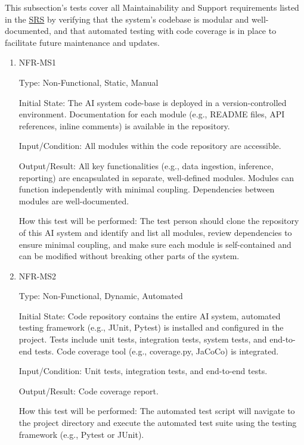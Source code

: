 \documentclass[12pt, titlepage]{article}
\begin{document}
\begin{enumerate}
This subsection's tests cover all Maintainability and Support requirements listed in the \href{https://github.com/RezaJodeiri/CXR-Capstone/blob/main/docs/SRS/SRS.pdf}{SRS} \citep{SRS}
 by verifying that the system's codebase is modular and well-documented, and that automated testing with code coverage is in place to facilitate future maintenance and updates.

\begin{enumerate}

\item{NFR-MS1}\label{NFR-MS1}

Type: Non-Functional, Static, Manual

Initial State: The AI system code-base is deployed in a version-controlled environment. Documentation for each module (e.g., README files, API references, inline comments) is available in the repository.

Input/Condition: All modules within the code repository are accessible.

Output/Result: All key functionalities (e.g., data ingestion, inference, reporting) are encapsulated in separate, well-defined modules. Modules can function independently with minimal coupling. Dependencies between modules are well-documented.

How this test will be performed: The test person should clone the repository of this AI system and identify and list all modules, review dependencies to ensure minimal coupling, and make sure each module is self-contained and can be modified without breaking other parts of the system.

\item{NFR-MS2}\label{NFR-MS2}

Type: Non-Functional, Dynamic, Automated

Initial State: Code repository contains the entire AI system, automated testing framework (e.g., JUnit, Pytest) is installed and configured in the project. Tests include unit tests, integration tests, system tests, and end-to-end tests. Code coverage tool (e.g., coverage.py, JaCoCo) is integrated.

Input/Condition: Unit tests, integration tests, and end-to-end tests.

Output/Result: Code coverage report.

How this test will be performed: The automated test script will navigate to the project directory and execute the automated test suite using the testing framework (e.g., Pytest or JUnit).


\end{enumerate}
\end{enumerate}
\end{document}
